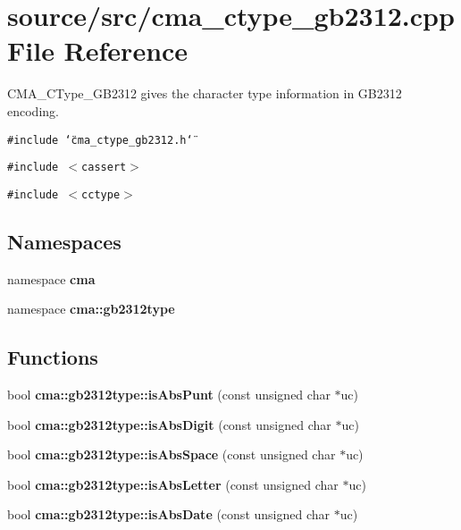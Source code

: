 \section{source/src/cma\_\-ctype\_\-gb2312.cpp File Reference}
\label{cma__ctype__gb2312_8cpp}
CMA\_\-CType\_\-GB2312 gives the character type information in GB2312 encoding. 

{\tt \#include \char`\"{}cma\_\-ctype\_\-gb2312.h\char`\"{}}\par
{\tt \#include $<$cassert$>$}\par
{\tt \#include $<$cctype$>$}\par
\subsection*{Namespaces}
\begin{CompactItemize}
\item 
namespace \textbf{cma}
\item 
namespace \textbf{cma::gb2312type}
\end{CompactItemize}
\subsection*{Functions}
\begin{CompactItemize}
\item 
bool {\bf cma::gb2312type::isAbsPunt} (const unsigned char $\ast$uc)
\item 
bool {\bf cma::gb2312type::isAbsDigit} (const unsigned char $\ast$uc)
\item 
bool {\bf cma::gb2312type::isAbsSpace} (const unsigned char $\ast$uc)
\item 
bool {\bf cma::gb2312type::isAbsLetter} (const unsigned char $\ast$uc)
\item 
bool {\bf cma::gb2312type::isAbsDate} (const unsigned char $\ast$uc)
\end{CompactItemize}
